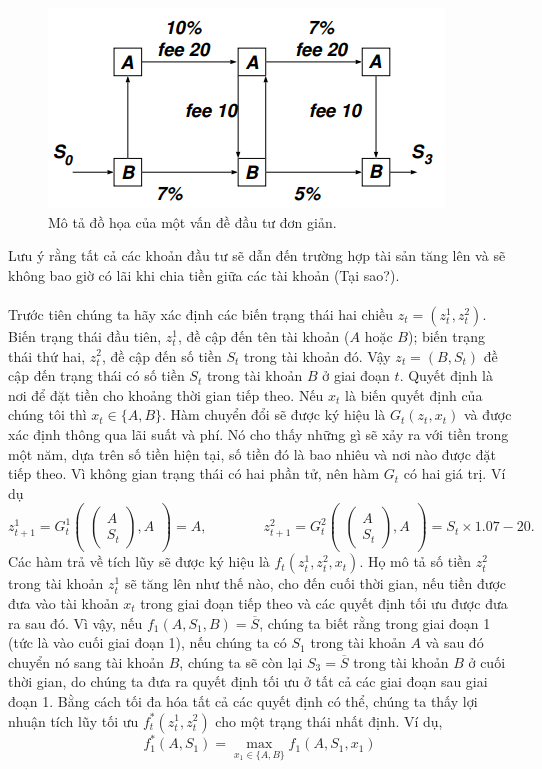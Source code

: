 \documentclass[12pt,a4paper]{report}
\begin{document}
		\begin{figure}[h]
			\centering
			\includegraphics[scale=1]{hinh4.png}
			\caption{
				Mô tả đồ họa của một vấn đề đầu tư đơn giản.}
		\end{figure} \noindent Lưu ý rằng tất cả các khoản đầu tư sẽ dẫn đến trường hợp tài sản tăng lên và sẽ không bao giờ có lãi khi chia tiền giữa các tài khoản (Tại sao?). \\\\Trước tiên chúng ta hãy xác định các biến trạng thái hai chiều $z_t = (z_t^1, z_t^2)$. Biến trạng thái đầu tiên, $z_t^1$, đề cập đến tên tài khoản ($A$ hoặc $B$); biến trạng thái thứ hai, $z_t^2$, đề cập đến số tiền $S_t$ trong tài khoản đó. Vậy $z_t = (B, S_t)$ đề cập đến trạng thái có số tiền $S_t$ trong tài khoản $B$ ở giai đoạn $t$. Quyết định là nơi để đặt tiền cho khoảng thời gian tiếp theo. Nếu $x_t$ là biến quyết định của chúng tôi thì $x_t \in \{A, B\}$. Hàm chuyển đổi sẽ được ký hiệu là $G_t (z_t, x_t)$ và được xác định thông qua lãi suất và phí. Nó cho thấy những gì sẽ xảy ra với tiền trong một năm, dựa trên số tiền hiện tại, số tiền đó là bao nhiêu và nơi nào được đặt tiếp theo. Vì không gian trạng thái có hai phần tử, nên hàm $G_t$ có hai giá trị. Ví dụ $$z_{t+1}^1= G_t^1 \begin{pmatrix}
		\begin{pmatrix}
			A\\S_t
		\end{pmatrix},A
		\end{pmatrix} = A , \qquad \qquad z_{t+1}^2 =  	G_t^2 \begin{pmatrix}
		\begin{pmatrix}
		A\\S_t
		\end{pmatrix},A
		\end{pmatrix} = S_t \times 1.07 - 20.$$ Các hàm trả về tích lũy sẽ được ký hiệu là $f_t(z_t^1, z_t^2, x_t)$. Họ
		mô tả số tiền $z^2_ t$ trong tài khoản $z_t^1$ sẽ tăng lên như thế nào, cho đến cuối thời gian, nếu tiền được đưa vào tài khoản $x_t$ trong giai đoạn tiếp theo và các quyết định tối ưu được đưa ra sau đó. Vì vậy, nếu $f_1 (A, S_1, B) = \overline{S}$, chúng ta biết rằng trong giai đoạn 1 (tức là vào cuối giai đoạn 1), nếu chúng ta có $S_1$ trong tài khoản $A$ và sau đó chuyển nó sang tài khoản $B$, chúng ta sẽ còn lại $S_3 = \overline{S}$ trong tài khoản $B$ ở cuối thời gian, do chúng ta đưa ra quyết định tối ưu ở tất cả các giai đoạn sau giai đoạn 1. Bằng cách tối đa hóa tất cả các quyết định có thể, chúng ta thấy lợi nhuận tích lũy tối ưu $f_t^* (z_t^1, z_t^2)$ cho một trạng thái nhất định. Ví dụ, $$f^*_1(A, S_1) = \max_{x_1 \in \{A, B\}}f_1(A, S_1, x_1)$$
\end{document}
